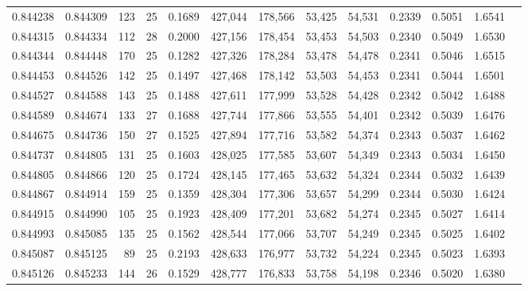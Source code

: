 \begin{tabular}{rrrrrrrrrrrrr}
0.844238 & 0.844309 &   123 &  25 &                                     0.1689 & 427,044 & 178,566 &  53,425 &  54,531 & 0.2339 & 0.5051 & 1.6541 \\
0.844315 & 0.844334 &   112 &  28 &                                     0.2000 & 427,156 & 178,454 &  53,453 &  54,503 & 0.2340 & 0.5049 & 1.6530 \\
0.844344 & 0.844448 &   170 &  25 &                                     0.1282 & 427,326 & 178,284 &  53,478 &  54,478 & 0.2341 & 0.5046 & 1.6515 \\
0.844453 & 0.844526 &   142 &  25 &                                     0.1497 & 427,468 & 178,142 &  53,503 &  54,453 & 0.2341 & 0.5044 & 1.6501 \\
0.844527 & 0.844588 &   143 &  25 &                                     0.1488 & 427,611 & 177,999 &  53,528 &  54,428 & 0.2342 & 0.5042 & 1.6488 \\
0.844589 & 0.844674 &   133 &  27 &                                     0.1688 & 427,744 & 177,866 &  53,555 &  54,401 & 0.2342 & 0.5039 & 1.6476 \\
0.844675 & 0.844736 &   150 &  27 &                                     0.1525 & 427,894 & 177,716 &  53,582 &  54,374 & 0.2343 & 0.5037 & 1.6462 \\
0.844737 & 0.844805 &   131 &  25 &                                     0.1603 & 428,025 & 177,585 &  53,607 &  54,349 & 0.2343 & 0.5034 & 1.6450 \\
0.844805 & 0.844866 &   120 &  25 &                                     0.1724 & 428,145 & 177,465 &  53,632 &  54,324 & 0.2344 & 0.5032 & 1.6439 \\
0.844867 & 0.844914 &   159 &  25 &                                     0.1359 & 428,304 & 177,306 &  53,657 &  54,299 & 0.2344 & 0.5030 & 1.6424 \\
0.844915 & 0.844990 &   105 &  25 &                                     0.1923 & 428,409 & 177,201 &  53,682 &  54,274 & 0.2345 & 0.5027 & 1.6414 \\
0.844993 & 0.845085 &   135 &  25 &                                     0.1562 & 428,544 & 177,066 &  53,707 &  54,249 & 0.2345 & 0.5025 & 1.6402 \\
0.845087 & 0.845125 &    89 &  25 &                                     0.2193 & 428,633 & 176,977 &  53,732 &  54,224 & 0.2345 & 0.5023 & 1.6393 \\
0.845126 & 0.845233 &   144 &  26 &                                     0.1529 & 428,777 & 176,833 &  53,758 &  54,198 & 0.2346 & 0.5020 & 1.6380 \\

\end{tabular}
